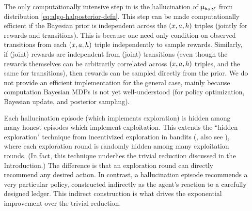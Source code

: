 

 The only computationally intensive step in  is the hallucination of $\upmu_{\mathrm{hal};\ell}$ from distribution  \eqref{eq:algo-halposterior-defn}. This step can be made computationally efficient if the Bayesian prior is independent across the $(x,a,h)$ triples (jointly for rewards and transitions). This is because one need only condition on observed transitions from each $(x,a,h)$ triple independently to sample rewards. Similarly, if (joint) rewards are independent from (joint) transitions (even though the rewards themselves can be arbitrarily correlated across $(x,a,h)$ triples, and the same for transitions), then rewards can be sampled directly from the prior. We do not provide an efficient implementation for the general case, mainly because computation Bayesian MDPs is not yet well-understood (\eg for policy optimization, Bayesian update, and posterior sampling).

Each hallucination episode (which implements exploration) is hidden among many honest episodes which implement exploitation. This extends the ``hidden exploration" technique from incentivized exploration in bandits
(\citep{ICexploration-ec15}, also see \citep[][Ch. 11]{slivkins-MABbook}), where each exploration round is randomly hidden among many exploitation rounds. (In fact, this technique underlies the trivial reduction discussed in the Introduction.) The difference is that an exploration round can directly recommend any desired action. In contrast, a hallucination episode recommends a very particular policy, constructed indirectly as the agent's reaction to a carefully designed ledger. This indirect construction is what drives the exponential improvement over the trivial reduction.
